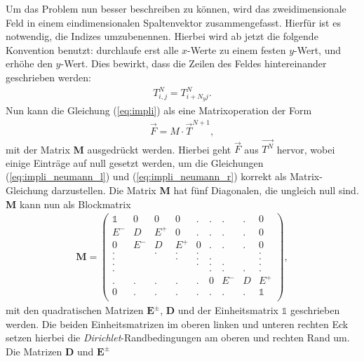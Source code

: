 \documentclass[12pt,a4paper,titlepage,headinclude,bibtotoc]{scrartcl}
\begin{document}
Um das Problem nun besser beschreiben zu können, wird das zweidimensionale Feld in einem eindimensionalen Spaltenvektor zusammengefasst. Hierfür ist es notwendig, die Indizes umzubenennen. Hierbei wird ab jetzt die folgende Konvention benutzt: durchlaufe erst alle $x$-Werte zu einem festen $y$-Wert, und erhöhe den $y$-Wert. Dies bewirkt, dass die Zeilen des Feldes hintereinander geschrieben werden:
\begin{align*}
T_{i,j}^{N} = T_{i+N_y j}^{N}.
\end{align*}
Nun kann die Gleichung (\ref{eq:impli}) als eine Matrixoperation der Form
\begin{align*}
\vec{F} = M \cdot \vec{T}^{N+1},
\end{align*} 
mit der Matrix \textbf{M} ausgedrückt werden. Hierbei geht $\vec{F}$ aus $\vec{T^N}$ hervor, wobei einige Einträge auf null gesetzt werden, um die Gleichungen (\ref{eq:impli_neumann_l}) und (\ref{eq:impli_neumann_r}) korrekt als Matrix-Gleichung darzustellen.
Die Matrix \textbf{M} hat fünf Diagonalen, die ungleich null sind. \textbf{M} kann nun als Blockmatrix
\begin{align*}
\boldsymbol{M} = \begin{pmatrix}
  \mathds{1}  & 0 & 0 &  0 & . & . & . & . & 0 \\
  E^-  & D & E^+ &  0 & . & . & . & . & 0 \\
  0  & E^- & D & E^+ & 0 &  . & . & . & 0\\
  . & & . & . & . & & & &  . \\
  . & & & . & . & . & & &  . \\
  . & & & &  . & . & . & &  . \\
  . & &  & & &  . & . & . &  . \\
  .  & . & . & . & . & 0 & E^- & D & E^+ \\
  0  & . & . & . & . & . & . & . & \mathds{1} \\
 \end{pmatrix}
,
\end{align*}
mit den quadratischen Matrizen $\textbf{E}^\pm$, \textbf{D} und der Einheitsmatrix $\mathds{1}$ geschrieben werden. Die beiden Einheitsmatrizen im oberen linken und unteren rechten Eck setzen hierbei die \textit{Dirichlet}-Randbedingungen am oberen und rechten Rand um.
Die Matrizen \textbf{D} und $\textbf{E}^\pm$ 
\end{document}
